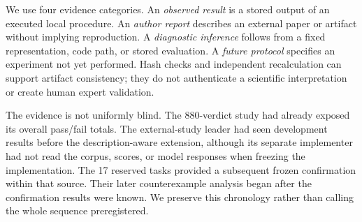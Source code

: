 \documentclass[10pt,twocolumn,letterpaper]{article}
\begin{document}
We use four evidence categories. An \emph{observed result} is a stored output of an executed local procedure. An \emph{author report} describes an external paper or artifact without implying reproduction. A \emph{diagnostic inference} follows from a fixed representation, code path, or stored evaluation. A \emph{future protocol} specifies an experiment not yet performed. Hash checks and independent recalculation can support artifact consistency; they do not authenticate a scientific interpretation or create human expert validation.

The evidence is not uniformly blind. The 880-verdict study had already exposed its overall pass/fail totals. The external-study leader had seen development results before the description-aware extension, although its separate implementer had not read the corpus, scores, or model responses when freezing the implementation. The 17 reserved tasks provided a subsequent frozen confirmation within that source. Their later counterexample analysis began after the confirmation results were known. We preserve this chronology rather than calling the whole sequence preregistered.
\end{document}
